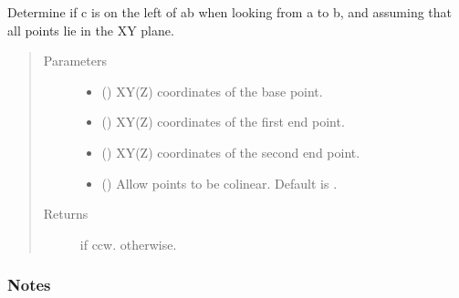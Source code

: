 \documentclass[letterpaper,10pt,english]{sphinxmanual}
\begin{document}
\begin{fulllineitems}
\label{\detokenize{cockatoo:cockatoo.utilities.is_ccw_xy}}
Determine if c is on the left of ab when looking from a to b,
and assuming that all points lie in the XY plane.
\begin{quote}\begin{description}
\item[{Parameters}] \leavevmode\begin{itemize}
\item {} 
 () \textendash{} XY(Z) coordinates of the base point.

\item {} 
 () \textendash{} XY(Z) coordinates of the first end point.

\item {} 
 () \textendash{} XY(Z) coordinates of the second end point.

\item {} 
 (\sphinxstyleliteralemphasis{\sphinxupquote{, }}) \textendash{} Allow points to be colinear.
Default is .

\end{itemize}

\item[{Returns}] \leavevmode
{} \textendash{}  if ccw.
 otherwise.

\end{description}\end{quote}
\subsubsection*{Notes}


\end{fulllineitems}
\end{document}
